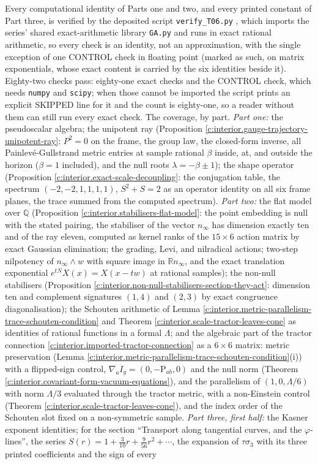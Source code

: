 \documentclass[11pt]{article}
\theoremstyle{definition}
\theoremstyle{plain}
\providecommand{\R}{}\renewcommand{\R}{\mathbb{R}}
\providecommand{\Sch}{}\renewcommand{\Sch}{\mathrm{P}}
\providecommand{\nInf}{}\renewcommand{\nInf}{n_\infty}
\begin{document}
\label{c:note.interior.setting-machine-verification}
Every computational identity of Parts one and two, and every printed constant of Part three, is verified by the deposited script \texttt{verify\_T06.py} \cite{ButlerVerifyT06}, which imports the series' shared exact-arithmetic library \texttt{GA.py} and runs in exact rational arithmetic, so every check is an identity, not an approximation, with the single exception of one CONTROL check in floating point (marked as such, on matrix exponentials, whose exact content is carried by the six identities beside it). Eighty-two checks pass: eighty-one exact checks and the CONTROL check, which needs \texttt{numpy} and \texttt{scipy}; when those cannot be imported the script prints an explicit SKIPPED line for it and the count is eighty-one, so a reader without them can still run every exact check. The coverage, by part. \emph{Part one:} the pseudoscalar algebra; the unipotent ray (Proposition \ref{c:interior.gauge-trajectory-unipotent-ray}: $P^2 = 0$ on the frame, the group law, the closed-form inverse, all Painlev\'e-Gullstrand metric entries at sample rational $\beta$ inside, at, and outside the horizon ($\beta = 1$ included), and the null roots $\lambda = -\beta \pm 1$); the shape operator (Proposition \ref{c:interior.exact-scale-decoupling}: the conjugation table, the spectrum $(-2,-2,1,1,1,1)$, $S^2 + S = 2$ as an operator identity on all six frame planes, the trace summed from the computed spectrum). \emph{Part two:} the flat model over $\mathbb{Q}$ (Proposition \ref{c:interior.stabilisers-flat-model}: the point embedding is null with the stated pairing, the stabiliser of the vector $\nInf$ has dimension exactly ten and of the ray eleven, computed as kernel ranks of the $15 \times 6$ action matrix by exact Gaussian elimination; the grading, Levi, and nilradical actions; two-step nilpotency of $\nInf \wedge w$ with square image in $\R\nInf$, and the exact translation exponential $e^{tN}X(x) = X(x - tw)$ at rational samples); the non-null stabilisers (Proposition \ref{c:interior.non-null-stabilisers-section-they-act}: dimension ten and complement signatures $(1,4)$ and $(2,3)$ by exact congruence diagonalisation); the Schouten arithmetic of Lemma \ref{c:interior.metric-parallelism-trace-schouten-condition} and Theorem \ref{c:interior.scale-tractor-leaves-cone} as identities of rational functions in a formal $\Lambda$; and the algebraic part of the tractor connection \ref{c:interior.imported-tractor-connection} as a $6 \times 6$ matrix: metric preservation (Lemma \ref{c:interior.metric-parallelism-trace-schouten-condition}(i)) with a flipped-sign control, $\nabla_a I_g = (0, -\Sch_{ab}, 0)$ and the null norm (Theorem \ref{c:interior.covariant-form-vacuum-equations}), and the parallelism of $(1, 0, \Lambda/6)$ with norm $\Lambda/3$ evaluated through the tractor metric, with a non-Einstein control (Theorem \ref{c:interior.scale-tractor-leaves-cone}), and the index order of the Schouten slot fixed on a non-symmetric sample. \emph{Part three, first half:} the Kasner exponent identities; for the section ``Transport along tangential curves, and the $\varphi$-lines'', the series $S(r) = 1 + \tfrac{3}{10}r + \tfrac{9}{56}r^2 + \cdots$, the expansion of $\tau\sigma_3$ with its three printed coefficients and the sign of every 
\end{document}
